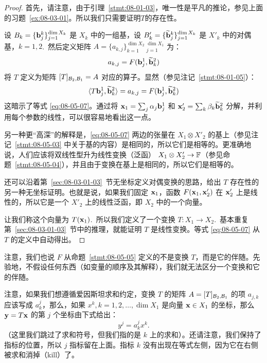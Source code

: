 \begin{proof}
首先，请注意，由于引理~\ref{stmt:08-01-03}，唯一性是平凡的推论，参见上面的习题~\ref{ex:08-03-01}。所以我们只需要证明$T$的存在性。

设 $B_k = \{\mathbf{b}^{k}_{j}\}_{j=1}^{\dim X_k}$ 是 $X_k$ 中的一组基，设 $B'_k = \{\widetilde{\mathbf{b}}^{k}_{j}\}_{j=1}^{\dim X_k}$ 是 $X'_k$ 中的对偶基，$k=1, 2$.~然后定义矩阵 $A = \{a_{k,j}\}_{k=1}^{\dim X_2}~_{j=1}^{\dim X_1}$ 为：
$$ a_{k,j} = F(\mathbf{b}^{1}_{j}, \widetilde{\mathbf{b}}^{2}_{k}) $$
将 $T$ 定义为矩阵 $[T]_{\mathcal{B}_2, \mathcal{B}_1} = A$ 对应的算子。显然（参见注记~\ref{stmt:08-01-05}）：
\begin{equation}\label{eq:08-05-08}
\langle T \mathbf{b}^{1}_{j}, \widetilde{\mathbf{b}}^{2}_{k} \rangle = a_{k,j} = F(\mathbf{b}^{1}_{j}, \widetilde{\mathbf{b}}^{2}_{k})
\end{equation}
这暗示了等式 \eqref{eq:08-05-07}。通过将 $\mathbf{x}_1 = \sum_j \alpha_j \mathbf{b}^1_j$ 和 $\mathbf{x}'_2 = \sum_k \beta_k \widetilde{\mathbf{b}}^2_k$ 分解，并利用每个参数的线性，可以很容易地看出这一点。

另一种更“高深”的解释是，\eqref{eq:08-05-07} 两边的张量在 $X_1 \otimes X'_2$ 的基上（参见注记~\ref{stmt:08-05-03} 中关于基的内容）是相同的，所以它们是相等的。更准确地说，人们应该将双线性型升为线性变换（泛函） $X_1 \otimes X'_2 \to \mathbb{F}$（参见命题~\ref{stmt:08-05-04}），并且由于变换在基上是相同的，所以它们是相等的。

还可以沿着第~\ref{sec:08-03-01-03}~节无坐标定义对偶变换的思路，给出 $T$ 存在性的另一种无坐标证明。也就是说，如果我们固定 $\mathbf{x}_1$，函数 $F(\mathbf{x}_1, \mathbf{x}'_2)$ 在 $\mathbf{x}'_2$ 上是线性的，所以它是一个 $X'_2$ 上的线性泛函，即 $X_2$ 中的一个向量。

让我们称这个向量为 $T(\mathbf{x}_1)$.~所以我们定义了一个变换 $T : X_1 \to X_2$.~基本重复第~\ref{sec:08-03-01-03}~节中的推理，就能证明 $T$ 是线性变换。等式 \eqref{eq:08-05-07} 从 $T$ 的定义中自动得出。\end{proof}

\begin{remark*}
注意，我们也说 $F$ 从命题~\ref{stmt:08-05-05} 定义的不是变换 $T$，而是它的伴随。先验地，不假设任何东西（如变量的顺序及其解释），我们就无法区分一个变换和它的伴随。
\end{remark*}

\begin{remark*}
注意，如果我们想遵循爱因斯坦求和约定，变换 $T$ 的矩阵 $A = [T]_{\mathcal{B}_2, \mathcal{B}_1}$ 的项 $a_{j,k}$ 应该写成 $a^j_k$，那么，如果 $x^k, k = 1, 2, \dots, \dim X_1$ 是向量 $\mathbf{x} \in X_1$ 的坐标，那么 $\mathbf{y} = T\mathbf{x}$ 的第 $j$ 个坐标由下式给出：
$$ y^j = a^j_k x^k .$$
（这里我们跳过了求和符号，但我们指的是 $k$ 上的求和）。还请注意，我们保持了指标的位置，所以 $j$ 指标留在上面。指标 $k$ 没有出现在等式左侧，因为它在右侧被求和消掉（kill）了。
\end{remark*}

